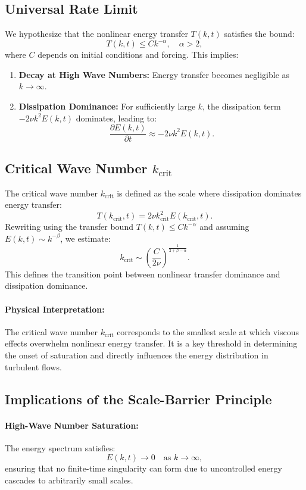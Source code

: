 \subsection{Universal Rate Limit}
We hypothesize that the nonlinear energy transfer $T(k, t)$ satisfies the bound:
\[
T(k, t) \leq C k^{-\alpha}, \quad \alpha > 2,
\]
where $C$ depends on initial conditions and forcing. This implies:
\begin{enumerate}
    \item \textbf{Decay at High Wave Numbers:} Energy transfer becomes negligible as $k \to \infty$.
    \item \textbf{Dissipation Dominance:} For sufficiently large $k$, the dissipation term $-2\nu k^2 E(k, t)$ dominates, leading to:
    \[
    \frac{\partial E(k, t)}{\partial t} \approx -2\nu k^2 E(k, t).
    \]
\end{enumerate}

\subsection{Critical Wave Number $k_{\text{crit}}$}
The critical wave number $k_{\text{crit}}$ is defined as the scale where dissipation dominates energy transfer:
\[
T(k_{\text{crit}}, t) = 2\nu k_{\text{crit}}^2 E(k_{\text{crit}}, t).
\]
Rewriting using the transfer bound $T(k, t) \leq C k^{-\alpha}$ and assuming $E(k, t) \sim k^{-\beta}$, we estimate:
\[
k_{\text{crit}} \sim \left(\frac{C}{2\nu}\right)^{\frac{1}{2+\beta-\alpha}}.
\]
This defines the transition point between nonlinear transfer dominance and dissipation dominance.

\paragraph{Physical Interpretation:} The critical wave number $k_{\text{crit}}$ corresponds to the smallest scale at which viscous effects overwhelm nonlinear energy transfer. It is a key threshold in determining the onset of saturation and directly influences the energy distribution in turbulent flows.

\subsection{Implications of the Scale-Barrier Principle}

\paragraph{High-Wave Number Saturation:}
The energy spectrum satisfies:
\[
E(k, t) \to 0 \quad \text{as } k \to \infty,
\]
ensuring that no finite-time singularity can form due to uncontrolled energy cascades to arbitrarily small scales.

